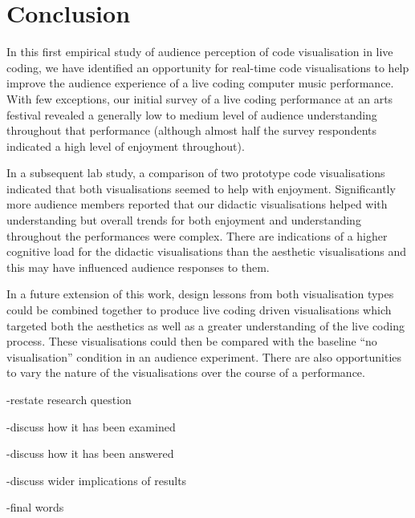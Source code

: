 
\chapter{Conclusion}
\label{chap:conclusion}


In this first empirical study of audience perception of code
visualisation in live coding, we have identified an opportunity for
real-time code visualisations to help improve the audience experience
of a live coding computer music performance. With few exceptions, our
initial survey of a live coding performance at an arts festival
revealed a generally low to medium level of audience understanding
throughout that performance (although almost half the survey
respondents indicated a high level of enjoyment throughout).

In a subsequent lab study, a comparison of two prototype code
visualisations indicated that both visualisations seemed to help with
enjoyment. Significantly more audience members reported that our
didactic visualisations helped with understanding but overall trends
for both enjoyment and understanding throughout the performances were
complex. There are indications of a higher cognitive load for the
didactic visualisations than the aesthetic visualisations and this may
have influenced audience responses to them.

In a future extension of this work, design lessons from both
visualisation types could be combined together to produce live coding
driven visualisations which targeted both the aesthetics as well as a
greater understanding of the live coding process. These visualisations
could then be compared with the baseline ``no visualisation''
condition in an audience experiment. There are also opportunities to
vary the nature of the visualisations over the course of a
performance.


-restate research question

-discuss how it has been examined

-discuss how it has been answered

-discuss wider implications of results

-final words
